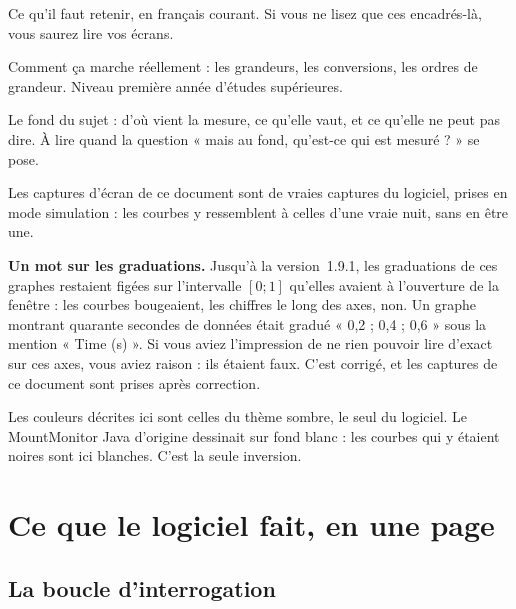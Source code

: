 \documentclass[a4paper,11pt,twoside]{report}
\begin{document}
\begin{simple}
Ce qu'il faut retenir, en français courant. Si vous ne lisez que ces
encadrés-là, vous saurez lire vos écrans.
\end{simple}

\begin{prepa}
Comment ça marche réellement : les grandeurs, les conversions, les ordres de
grandeur. Niveau première année d'études supérieures.
\end{prepa}

\begin{avance}
Le fond du sujet : d'où vient la mesure, ce qu'elle vaut, et ce qu'elle ne
peut pas dire. À lire quand la question « mais au fond, qu'est-ce qui est
mesuré ? » se pose.
\end{avance}

\vspace{0.4cm}
\noindent Les captures d'écran de ce document sont de vraies captures du
logiciel, prises en mode simulation : les courbes y ressemblent à celles
d'une vraie nuit, sans en être une.

\begin{info}
\textbf{Un mot sur les graduations.} Jusqu'à la version~1.9.1, les
graduations de ces graphes restaient figées sur l'intervalle $[0 ; 1]$ qu'elles
avaient à l'ouverture de la fenêtre : les courbes bougeaient, les chiffres le
long des axes, non. Un graphe montrant quarante secondes de données était
gradué « 0,2 ; 0,4 ; 0,6 » sous la mention « Time (s) ». Si vous aviez
l'impression de ne rien pouvoir lire d'exact sur ces axes, vous aviez
raison : ils étaient faux. C'est corrigé, et les captures de ce document sont
prises après correction.
\end{info}

\begin{warning}
Les couleurs décrites ici sont celles du thème sombre, le seul du logiciel.
Le MountMonitor Java d'origine dessinait sur fond blanc : les courbes qui y
étaient noires sont ici blanches. C'est la seule inversion.
\end{warning}

\chapter{Ce que le logiciel fait, en une page}

\section{La boucle d'interrogation}
\end{document}
